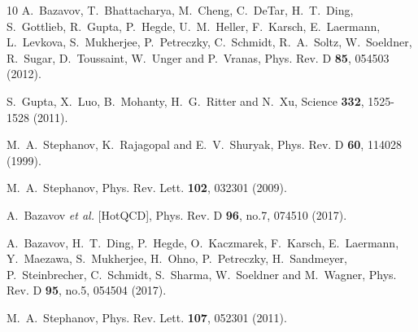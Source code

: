 \documentclass[10pt,aps,prc,twocolumn,floatfix]{revtex4-1}
\begin{document}
\begin{thebibliography}{10}
A.~Bazavov, T.~Bhattacharya, M.~Cheng, C.~DeTar, H.~T.~Ding, S.~Gottlieb, R.~Gupta, P.~Hegde, U.~M.~Heller, F.~Karsch, E.~Laermann, L.~Levkova, S.~Mukherjee, P.~Petreczky, C.~Schmidt, R.~A.~Soltz, W.~Soeldner, R.~Sugar, D.~Toussaint, W.~Unger and P.~Vranas,
Phys. Rev. D \textbf{85}, 054503 (2012).

S.~Gupta, X.~Luo, B.~Mohanty, H.~G.~Ritter and N.~Xu,
Science \textbf{332}, 1525-1528 (2011).

M.~A.~Stephanov, K.~Rajagopal and E.~V.~Shuryak, 
Phys. Rev. D \textbf{60}, 114028 (1999). 


M.~A.~Stephanov,
Phys. Rev. Lett. \textbf{102}, 032301 (2009).

A.~Bazavov \textit{et al.} [HotQCD],
Phys. Rev. D \textbf{96}, no.7, 074510 (2017).

A.~Bazavov, H.~T.~Ding, P.~Hegde, O.~Kaczmarek, F.~Karsch, E.~Laermann, Y.~Maezawa, S.~Mukherjee, H.~Ohno, P.~Petreczky, H.~Sandmeyer, P.~Steinbrecher, C.~Schmidt, S.~Sharma, W.~Soeldner and M.~Wagner,
Phys. Rev. D \textbf{95}, no.5, 054504 (2017).

M.~A.~Stephanov, 
Phys. Rev. Lett. \textbf{107}, 052301 (2011).


\end{thebibliography}
\end{document}
